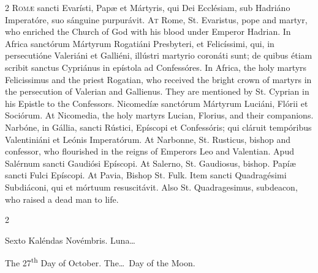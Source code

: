 \begin{paracol}{2}
\lettrine[lines=2]{R}{omæ} sancti Evarísti, 
 Papæ et Mártyris, qui Dei Ecclésiam, sub Hadriáno Imperatóre, suo sánguine 
 purpurávit.
\switchcolumn
{}
\lettrine[lines=2]{A}{t} Rome, St. Evaristus, pope and 
 martyr, who enriched the Church of God with his blood under Emperor Hadrian.
\switchcolumn*
{}
In Africa sanctórum 
 Mártyrum Rogatiáni Presbyteri, et Felicíssimi, qui, in persecutióne 
 Valeriáni et Galliéni, illústri martyrio coronáti sunt; de quibus étiam 
 scribit sanctus Cypriánus in epístola ad Confessóres.
\switchcolumn
{}
In Africa, the holy martyrs 
 Felicissimus and the priest Rogatian, who received the bright crown of 
 martyrs in the persecution of Valerian and Gallienus. They are 
 mentioned by St. Cyprian in his Epistle to the Confessors.
\switchcolumn*
{}
Nicomedíæ sanctórum 
 Mártyrum Luciáni, Flórii et Sociórum.
\switchcolumn
{}
At Nicomedia, the holy martyrs 
 Lucian, Florius, and their companions.
\switchcolumn*
{}
Narbóne, in Gállia, 
 sancti Rústici, Epíscopi et Confessóris; qui cláruit tempóribus Valentiniáni 
 et Leónis Imperatórum.
\switchcolumn
{}
At Narbonne, St. Rusticus, bishop 
 and confessor, who flourished in the reigns of Emperors Leo and Valentian.
\switchcolumn*
{}
Apud Salérnum sancti 
 Gaudiósi Epíscopi.
\switchcolumn
{}
At Salerno, St. Gaudiosus, bishop.
\switchcolumn*
{}
Papíæ sancti Fulci 
 Epíscopi.
\switchcolumn
{}
At Pavia, Bishop St. Fulk.
\switchcolumn*
{}
Item sancti 
 Quadragésimi Subdiáconi, qui et mórtuum resuscitávit.
\switchcolumn
{}
Also St. Quadragesimus, subdeacon, 
 who raised a dead man to life.
\switchcolumn*
{}
\end{paracol}


\begin{paracol}{2}
\begin{center}{\color{gregoriocolor} Sexto Kaléndas Novémbris. 
 Luna\dots\ }\end{center}
\switchcolumn
{}
\begin{center}{\color{gregoriocolor} The 
 27\textsuperscript{th} Day of 
 October. The\dots\ Day of the Moon.}\end{center}
\end{paracol}

